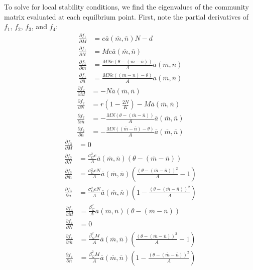 \documentclass{amsart}
\theoremstyle{definition}
\theoremstyle{remark}
\numberwithin{equation}{section}
\begin{document}
To solve for local stability conditions, we find the eigenvalues of the community matrix evaluated at each equilbrium point.  First, note the partial derivatives of $f_1$, $f_2$, $f_3$, and $f_4$:
\begin{align*}
	\frac{\partial f_1}{\partial M} &= e\overline{a}(\overline{m}, \overline{n})N - d\\[5px]
	\frac{\partial f_1}{\partial N} &= Me\overline{a}(\overline{m}, \overline{n})\\[5px]
	\frac{\partial f_1}{\partial \overline{m}} &= \frac{MNe(\theta - (\overline{m} - \overline{n}))}{A}\overline{a}(\overline{m}, \overline{n}) \\[5px]
	\frac{\partial f_1}{\partial \overline{n}} &= \frac{MNe((\overline{m} - \overline{n}) - \theta)}{A}\overline{a}(\overline{m}, \overline{n})
\end{align*}
\begin{align*}
	\frac{\partial f_2}{\partial M} &= -N\overline{a}(\overline{m}, \overline{n}) \\[5px]
	\frac{\partial f_2}{\partial N} &= r\left(1 - \frac{2N}{K}\right) - M\overline{a}(\overline{m}, \overline{n})\\[5px]
	\frac{\partial f_2}{\partial \overline{m}} &= -\frac{MN(\theta - (\overline{m} - \overline{n}))}{A}\overline{a}(\overline{m}, \overline{n}) \\[5px]
	\frac{\partial f_2}{\partial \overline{n}} &= -\frac{MN((\overline{m} - \overline{n}) - \theta)}{A}\overline{a}(\overline{m}, \overline{n})
\end{align*}
\begin{align*}
	\frac{\partial f_3}{\partial M} &= 0 \\[5px]
	\frac{\partial f_3}{\partial N} &= \frac{\sigma_{G}^2e}{A}\overline{a}(\overline{m}, \overline{n})(\theta - (\overline{m} - \overline{n})) \\[5px]
	\frac{\partial f_3}{\partial \overline{m}} &= \frac{\sigma_G^2eN}{A}\overline{a}(\overline{m}, \overline{n})\left(\frac{(\theta - (\overline{m} - \overline{n}))^2}{A} - 1\right)\\[5px]
	\frac{\partial f_3}{\partial \overline{n}} &= \frac{\sigma_G^2eN}{A}\overline{a}(\overline{m}, \overline{n})\left(1 - \frac{(\theta - (\overline{m} - \overline{n}))^2}{A}\right)
\end{align*}
\begin{align*}
	\frac{\partial f_4}{\partial M} &= \frac{\beta_{G}^2}{A}\overline{a}(\overline{m}, \overline{n})(\theta - (\overline{m} - \overline{n})) \\[5px]
	\frac{\partial f_4}{\partial N} &= 0 \\[5px]
	\frac{\partial f_4}{\partial \overline{m}} &= \frac{\beta_G^2M}{A}\overline{a}(\overline{m}, \overline{n})\left(\frac{(\theta - (\overline{m} - \overline{n}))^2}{A} - 1\right)\\[5px]
	\frac{\partial f_4}{\partial \overline{n}} &= \frac{\beta_G^2M}{A}\overline{a}(\overline{m}, \overline{n})\left(1 - \frac{(\theta - (\overline{m} - \overline{n}))^2}{A}\right)
\end{align*}
\end{document}

